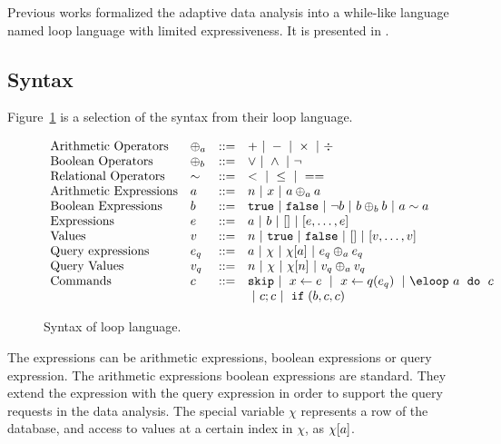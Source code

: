 Previous works formalized the adaptive data analysis into a while-like language named loop language with  limited expressiveness.
It is presented in .
\subsection*{Syntax}
Figure~\ref{fig:prework_syntax} is a selection of the syntax from their loop language.
{\small
\begin{figure}
\[
\begin{array}{llll}
 \mbox{Arithmetic Operators} & \oplus_a & ::= & + ~|~ - ~|~ \times 
%
~|~ \div \\  
  \mbox{Boolean Operators} & \oplus_b & ::= & \lor ~|~ \land ~|~ \neg\\
   \mbox{Relational Operators} & \sim & ::= & < ~|~ \leq ~|~ == \\  
\mbox{Arithmetic Expressions} & \aexpr & ::= & 
	n ~|~ x ~|~ \aexpr \oplus_a \aexpr  \\
\mbox{Boolean Expressions} & \bexpr & ::= & 
	\etrue ~|~ \efalse  ~|~ \neg \bexpr
	 ~|~ \bexpr \oplus_b \bexpr
	~|~ \aexpr \sim \aexpr \\
\mbox{Expressions} & \expr & ::= & \aexpr ~|~ \bexpr ~|~ [] ~|~ [\expr, \dots, \expr] \\	
\mbox{Values} & v & ::= & n ~|~ \etrue ~|~ \efalse ~|~ [] ~|~ [v, \dots, v] \\
\mbox{Query expressions} & \expr_q & ::= & \aexpr ~|~ \chi ~|~ \chi[\aexpr] ~|~ \expr_q \oplus_a \expr_q \\
\mbox{Query Values} & v_q & ::= & n ~|~ \chi ~|~ \chi[n] ~|~ v_q \oplus_a  v_q \\
\mbox{Commands} & c & ::= &  \eskip  ~|~  \assign x \expr ~|~  \assign{x}{ q(\expr_q)}
%
~|~ \eloop ~ \aexpr  ~ \edo ~ c  \\ &&& ~|~ c;c  ~|~ \eif(\bexpr, c, c)
\end{array}
\]
 \caption{Syntax of loop language.}
    \label{fig:prework_syntax}
\end{figure}
}
The expressions can be arithmetic expressions, boolean expressions or query expression.
The arithmetic expressions boolean expressions are standard.
They extend the expression with the query expression in order to support the query requests in the data analysis.
The special variable $\chi$ represents a row of the database,
and access to values at a certain index in $\chi$, as $\chi[a]$.
